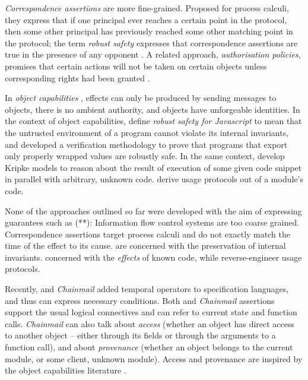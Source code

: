 \emph{Correspondence assertions} are more fine-grained. Proposed for 
process calculi, they %
{express}  that if one principal ever reaches a certain point in the protocol, 
then some other principal has previously reached some other matching point in the protocol; 
the term \emph{robust safety}  expresses that correspondence assertions are true in the presence of any opponent %
\cite{correspondence}. 
A related approach,  \emph{authorisation policies}, 
promises that certain actions will not be taken on certain objects
unless corresponding  rights had been granted  \cite{Maffeis:aiamb:thesis00}.

In   \emph{object capabilities} \cite{MillerPhD},
effects can only be produced by sending messages to objects,  there
is no ambient authority, and  objects 
have unforgeable identities.
In the context of object capabilities, \citeauthor{ddd} define  \emph{robust safety for Javascript}  
to mean that the untrusted environment of a program cannot violate 
its internal invariants, and developed  a verification methodology   to 
prove   that programs that  export only properly wrapped values  are robustly safe.
In the same context, \citeauthor{dd} develop Kripke models to reason about 
the result of execution of some given code snippet in parallel
with arbitrary, unknown code.  
 \cite{threoremsFreeSep} derive usage protocols out of a module's code.

{None} of the approaches outlined so far were developed with
 the aim of expressing guarantees such as (**):  
  Information flow control systems are too
 coarse grained. Correspondence assertions target process calculi and do not exactly match 
 the time of the effect to its cause. \citeauthor{ddd} are concerned with the preservation of
 internal invariants. \citeauthor{dd}   
 concerned with the \emph{effects} of known code,
 while \cite{threoremsFreeSep}  reverse-engineer usage protocols.
 
Recently,  {}  \cite{VerX}  and   \emph{Chainmail}  \cite{FASE} 
 added temporal operators to specification languages, and thus can express necessary conditions.  
 Both  {}  and   \emph{Chainmail} assertions support the usual 
   logical connectives and can refer to current state and function calls.
 \emph{Chainmail} 
 can also talk about \emph{access} (whether an
 object has direct access to another object -- either through its fields or 
 through the arguments to a function call),  and about \emph{provenance} (whether an object
 belongs to the current module, or some client, unknown module).
Access and provenance are inspired by the object capabilities
 literature \cite{MillerPhD}. 
 
